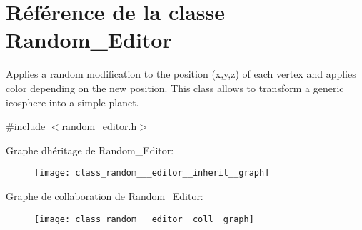 \hypertarget{class_random___editor}{}\section{Référence de la classe Random\+\_\+\+Editor}
\label{class_random___editor}


Applies a random modification to the position (x,y,z) of each vertex and applies color depending on the new position. This class allows to transform a generic icosphere into a simple planet.  




{\ttfamily \#include $<$random\+\_\+editor.\+h$>$}



Graphe d\textquotesingle{}héritage de Random\+\_\+\+Editor\+:
\nopagebreak
\begin{figure}[H]
\begin{center}
\leavevmode
\texttt{[image: class\_random\_\_\_editor\_\_inherit\_\_graph]}
\end{center}
\end{figure}


Graphe de collaboration de Random\+\_\+\+Editor\+:
\nopagebreak
\begin{figure}[H]
\begin{center}
\leavevmode
\texttt{[image: class\_random\_\_\_editor\_\_coll\_\_graph]}
\end{center}
\end{figure}
